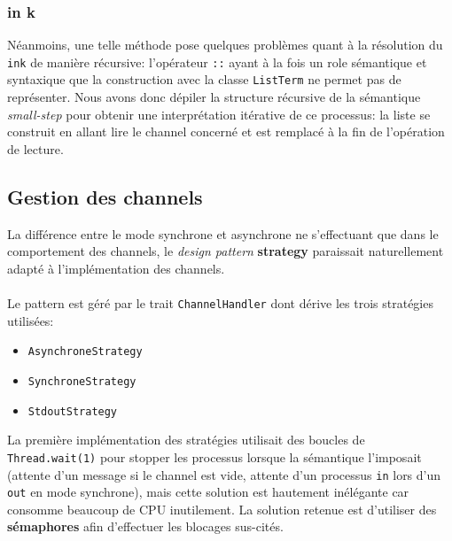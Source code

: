 \documentclass[11pt]{article} %
\begin{document}
\subsubsection{in k}
Néanmoins, une telle méthode pose quelques problèmes quant à la résolution du \texttt{ink} de manière récursive: l'opérateur \texttt{::} ayant à la fois un role sémantique et syntaxique que la construction avec la classe \texttt{ListTerm} ne permet pas de représenter. Nous avons donc dépiler la structure récursive de la sémantique \emph{small-step} pour obtenir une interprétation itérative de ce processus: la liste se construit en allant lire le channel concerné et est remplacé à la fin de l'opération de lecture.

\subsection{Gestion des channels}

La différence entre le mode synchrone et asynchrone ne s'effectuant que dans le comportement des channels, le \emph{design pattern} \textbf{strategy} paraissait naturellement adapté à l'implémentation des channels.\\\\
Le pattern est géré par le trait \texttt{ChannelHandler} dont dérive les trois stratégies utilisées: 
\begin{itemize}
	\item \texttt{AsynchroneStrategy}
	\item \texttt{SynchroneStrategy}
	\item \texttt{StdoutStrategy}
\end{itemize}

La première implémentation des stratégies utilisait des boucles de \texttt{Thread.wait(1)} pour stopper les processus lorsque la sémantique l'imposait (attente d'un message si le channel est vide, attente d'un processus \texttt{in} lors d'un \texttt{out} en mode synchrone), mais cette solution est hautement inélégante car consomme beaucoup de CPU inutilement. La solution retenue est d'utiliser des \textbf{sémaphores} afin d'effectuer les blocages sus-cités.
\end{document}
